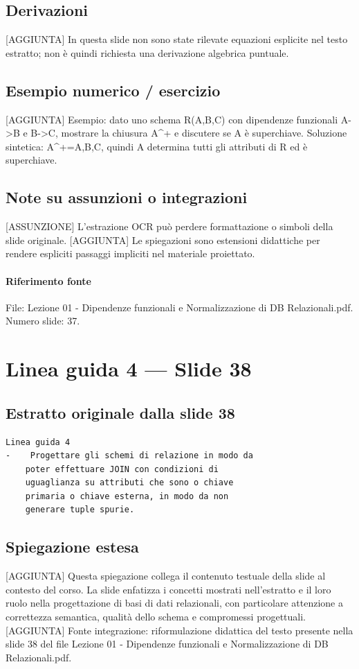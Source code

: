 \documentclass[11pt]{article}
\begin{document}
\subsection*{Derivazioni}
[AGGIUNTA] In questa slide non sono state rilevate equazioni esplicite nel testo estratto; non è quindi richiesta una derivazione algebrica puntuale.
\subsection*{Esempio numerico / esercizio}
[AGGIUNTA] Esempio: dato uno schema R(A,B,C) con dipendenze funzionali A->B e B->C, mostrare la chiusura A^+ e discutere se A è superchiave. Soluzione sintetica: A^+={A,B,C}, quindi A determina tutti gli attributi di R ed è superchiave.
\subsection*{Note su assunzioni o integrazioni}
[ASSUNZIONE] L'estrazione OCR può perdere formattazione o simboli della slide originale.
[AGGIUNTA] Le spiegazioni sono estensioni didattiche per rendere espliciti passaggi impliciti nel materiale proiettato.
\paragraph{Riferimento fonte} File: Lezione 01 - Dipendenze funzionali e Normalizzazione di DB Relazionali.pdf. Numero slide: 37.
\section{Linea guida 4 --- Slide 38}
\subsection*{Estratto originale dalla slide 38}
\begin{lstlisting}
Linea guida 4
-    Progettare gli schemi di relazione in modo da
    poter effettuare JOIN con condizioni di
    uguaglianza su attributi che sono o chiave
    primaria o chiave esterna, in modo da non
    generare tuple spurie.
\end{lstlisting}
\subsection*{Spiegazione estesa}
[AGGIUNTA] Questa spiegazione collega il contenuto testuale della slide al contesto del corso. La slide enfatizza i concetti mostrati nell'estratto e il loro ruolo nella progettazione di basi di dati relazionali, con particolare attenzione a correttezza semantica, qualità dello schema e compromessi progettuali.
[AGGIUNTA] Fonte integrazione: riformulazione didattica del testo presente nella slide 38 del file Lezione 01 - Dipendenze funzionali e Normalizzazione di DB Relazionali.pdf.
\end{document}
